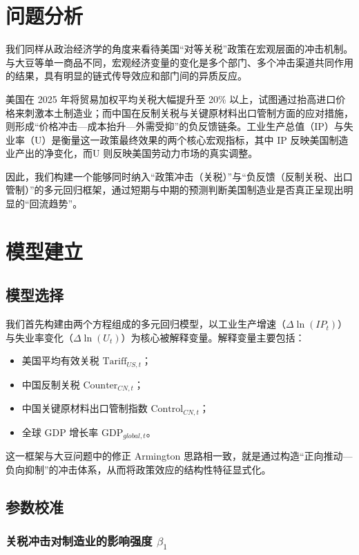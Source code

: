 \documentclass[12pt]{ctexart}
\begin{document}
\section{问题分析}

我们同样从政治经济学的角度来看待美国“对等关税”政策在宏观层面的冲击机制。与大豆等单一商品不同，宏观经济变量的变化是多个部门、多个冲击渠道共同作用的结果，具有明显的链式传导效应和部门间的异质反应。

美国在 2025 年将贸易加权平均关税大幅提升至 20\% 以上，试图通过抬高进口价格来刺激本土制造业；而中国在反制关税与关键原材料出口管制方面的应对措施，则形成“价格冲击—成本抬升—外需受抑”的负反馈链条。工业生产总值（IP）与失业率（U）是衡量这一政策最终效果的两个核心宏观指标，其中 IP 反映美国制造业产出的净变化，而U 则反映美国劳动力市场的真实调整。

因此，我们构建一个能够同时纳入“政策冲击（关税）”与“负反馈（反制关税、出口管制）”的多元回归框架，通过短期与中期的预测判断美国制造业是否真正呈现出明显的“回流趋势”。

\section{模型建立}

\subsection{模型选择}

我们首先构建由两个方程组成的多元回归模型，以工业生产增速（$\Delta \ln(IP_t)$）与失业率变化（$\Delta \ln(U_t)$）为核心被解释变量。解释变量主要包括：

\begin{itemize}
    \item 美国平均有效关税 $\text{Tariff}_{US,t}$；
    \item 中国反制关税 $\text{Counter}_{CN,t}$；
    \item 中国关键原材料出口管制指数 $\text{Control}_{CN,t}$；
    \item 全球 GDP 增长率 $\text{GDP}_{global,t}$。
\end{itemize}

这一框架与大豆问题中的修正 Armington 思路相一致，就是通过构造“正向推动—负向抑制”的冲击体系，从而将政策效应的结构性特征显式化。

\subsection{参数校准}

\subsubsection{关税冲击对制造业的影响强度 $\beta_1$}
\end{document}

